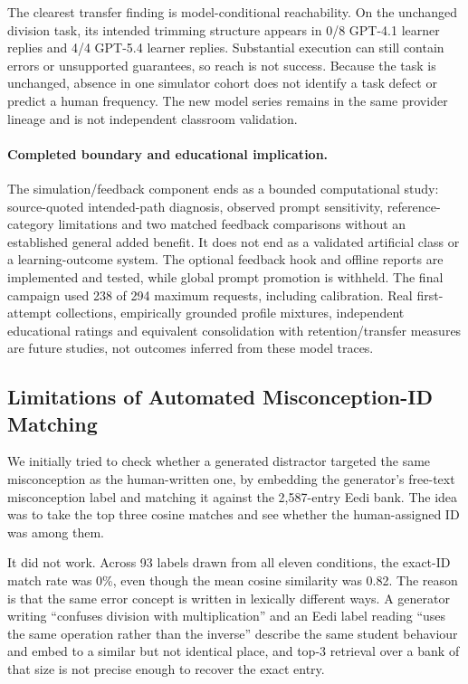 The clearest transfer finding is model-conditional reachability. On the unchanged division task, its intended trimming structure appears in 0/8 GPT-4.1 learner replies and 4/4 GPT-5.4 learner replies. Substantial execution can still contain errors or unsupported guarantees, so reach is not success. Because the task is unchanged, absence in one simulator cohort does not identify a task defect or predict a human frequency. The new model series remains in the same provider lineage and is not independent classroom validation.

\paragraph{Completed boundary and educational implication.}
The simulation/feedback component ends as a bounded computational study: source-quoted intended-path diagnosis, observed prompt sensitivity, reference-category limitations and two matched feedback comparisons without an established general added benefit. It does not end as a validated artificial class or a learning-outcome system. The optional feedback hook and offline reports are implemented and tested, while global prompt promotion is withheld. The final campaign used 238 of 294 maximum requests, including calibration. Real first-attempt collections, empirically grounded profile mixtures, independent educational ratings and equivalent consolidation with retention/transfer measures are future studies, not outcomes inferred from these model traces.

\subsection{Limitations of Automated Misconception-ID Matching}
\label{sec:mc-recall-limitation}

We initially tried to check whether a generated distractor targeted the same misconception as the human-written one, by embedding the generator's free-text misconception label and matching it against the 2{,}587-entry Eedi bank. The idea was to take the top three cosine matches and see whether the human-assigned ID was among them.

It did not work. Across 93 labels drawn from all eleven conditions, the exact-ID match rate was 0\%, even though the mean cosine similarity was 0.82. The reason is that the same error concept is written in lexically different ways. A generator writing ``confuses division with multiplication'' and an Eedi label reading ``uses the same operation rather than the inverse'' describe the same student behaviour and embed to a similar but not identical place, and top-3 retrieval over a bank of that size is not precise enough to recover the exact entry.

